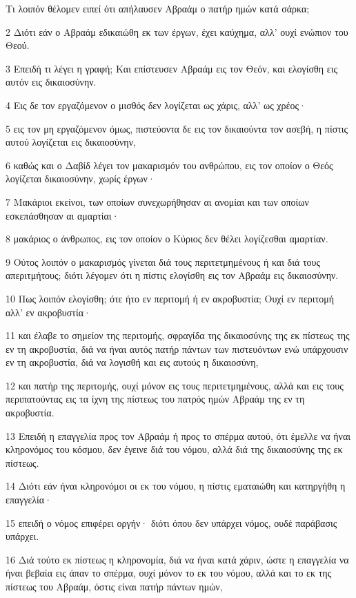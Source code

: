 \par Τι λοιπόν θέλομεν ειπεί ότι απήλαυσεν Αβραάμ ο πατήρ ημών κατά σάρκα;
\par 2 Διότι εάν ο Αβραάμ εδικαιώθη εκ των έργων, έχει καύχημα, αλλ' ουχί ενώπιον του Θεού.
\par 3 Επειδή τι λέγει η γραφή; Και επίστευσεν Αβραάμ εις τον Θεόν, και ελογίσθη εις αυτόν εις δικαιοσύνην.
\par 4 Εις δε τον εργαζόμενον ο μισθός δεν λογίζεται ως χάρις, αλλ' ως χρέος·
\par 5 εις τον μη εργαζόμενον όμως, πιστεύοντα δε εις τον δικαιούντα τον ασεβή, η πίστις αυτού λογίζεται εις δικαιοσύνην,
\par 6 καθώς και ο Δαβίδ λέγει τον μακαρισμόν του ανθρώπου, εις τον οποίον ο Θεός λογίζεται δικαιοσύνην, χωρίς έργων·
\par 7 Μακάριοι εκείνοι, των οποίων συνεχωρήθησαν αι ανομίαι και των οποίων εσκεπάσθησαν αι αμαρτίαι·
\par 8 μακάριος ο άνθρωπος, εις τον οποίον ο Κύριος δεν θέλει λογίζεσθαι αμαρτίαν.
\par 9 Ούτος λοιπόν ο μακαρισμός γίνεται διά τους περιτετμημένους ή και διά τους απεριτμήτους; διότι λέγομεν ότι η πίστις ελογίσθη εις τον Αβραάμ εις δικαιοσύνην.
\par 10 Πως λοιπόν ελογίσθη; ότε ήτο εν περιτομή ή εν ακροβυστία; Ουχί εν περιτομή αλλ' εν ακροβυστία·
\par 11 και έλαβε το σημείον της περιτομής, σφραγίδα της δικαιοσύνης της εκ πίστεως της εν τη ακροβυστία, διά να ήναι αυτός πατήρ πάντων των πιστευόντων ενώ υπάρχουσιν εν τη ακροβυστία, διά να λογισθή και εις αυτούς η δικαιοσύνη,
\par 12 και πατήρ της περιτομής, ουχί μόνον εις τους περιτετμημένους, αλλά και εις τους περιπατούντας εις τα ίχνη της πίστεως του πατρός ημών Αβραάμ της εν τη ακροβυστία.
\par 13 Επειδή η επαγγελία προς τον Αβραάμ ή προς το σπέρμα αυτού, ότι έμελλε να ήναι κληρονόμος του κόσμου, δεν έγεινε διά του νόμου, αλλά διά της δικαιοσύνης της εκ πίστεως.
\par 14 Διότι εάν ήναι κληρονόμοι οι εκ του νόμου, η πίστις εματαιώθη και κατηργήθη η επαγγελία·
\par 15 επειδή ο νόμος επιφέρει οργήν· διότι όπου δεν υπάρχει νόμος, ουδέ παράβασις υπάρχει.
\par 16 Διά τούτο εκ πίστεως η κληρονομία, διά να ήναι κατά χάριν, ώστε η επαγγελία να ήναι βεβαία εις άπαν το σπέρμα, ουχί μόνον το εκ του νόμου, αλλά και το εκ της πίστεως του Αβραάμ, όστις είναι πατήρ πάντων ημών,
